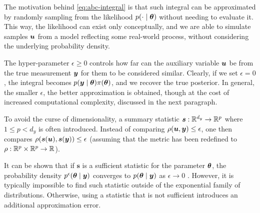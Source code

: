 The motivation behind \eqref{eq:abc-integral} is that such integral can be approximated by randomly sampling from the likelihood $p(\cdot \mid \bm{\theta})$ without needing to evaluate it. This way, the likelihood can exist only conceptually, and we are able to simulate samples $\bm{u}$ from a model reflecting some real-world process, without considering the underlying probability density.

The hyper-parameter $\epsilon \geq 0$ controls how far can the auxiliary variable $\bm{u}$ be from the true measurement $\bm{y}$ for them to be considered similar. Clearly, if we set $\epsilon = 0$, the integral becomes $p(\bm{y} \mid \bm{\theta}) \pi(\bm{\theta})$, and we recover the true posterior. In general, the smaller $\epsilon$, the better approximation is obtained, though at the cost of increased computational complexity, discussed in the next paragraph.

To avoid the curse of dimensionality, a summary statistic $\bm{s}: \mathbb{R}^{d_y} \to \mathbb{R}^p$ where $1 \leq p < d_y$ is often introduced. Instead of comparing $\rho(\bm{u}, \bm{y}) \leq \epsilon$, one then compares $\rho(\bm{s}(\bm{u}), \bm{s}(\bm{y})) \leq \epsilon$ (assuming that the metric has been redefined to $\rho: \mathbb{R}^p \times \mathbb{R}^p \to \mathbb{R}$).

It can be shown that if $\bm{s}$ is a sufficient statistic for the parameter $\bm{\theta}$, the probability density $p^\epsilon(\bm{\theta} \mid \bm{y})$ converges to $p(\bm{\theta} \mid \bm{y})$ as $\epsilon \to 0$ \citep{jasra-time-series}. However, it is typically impossible to find such statistic outside of the exponential family of distributions. Otherwise, using a statistic that is not sufficient introduces an additional approximation error.

